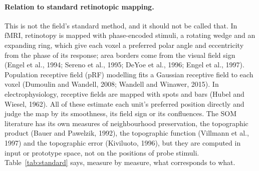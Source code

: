 \documentclass[11pt,a4paper]{article}
\begin{document}
\paragraph{Relation to standard retinotopic mapping.} This is not the field's
standard method, and it should not be called that. In fMRI, retinotopy is mapped
with phase-encoded stimuli, a rotating wedge and an expanding ring, which give each
voxel a preferred polar angle and eccentricity from the phase of its response; area
borders come from the visual field sign (Engel et al., 1994; Sereno et al., 1995;
DeYoe et al., 1996; Engel et al., 1997). Population receptive field (pRF) modelling
fits a Gaussian receptive field to each voxel (Dumoulin and Wandell, 2008; Wandell
and Winawer, 2015). In electrophysiology, receptive fields are mapped with spots
and bars (Hubel and Wiesel, 1962). All of these estimate each unit's preferred
position directly and judge the map by its smoothness, its field sign or its
confluences. The SOM literature has its own measures of neighbourhood preservation,
the topographic product (Bauer and Pawelzik, 1992), the topographic function
(Villmann et al., 1997) and the topographic error (Kiviluoto, 1996), but they are
computed in input or prototype space, not on the positions of probe stimuli. Table~\ref{tab:standard} says, measure by measure, what corresponds to what.
\end{document}
